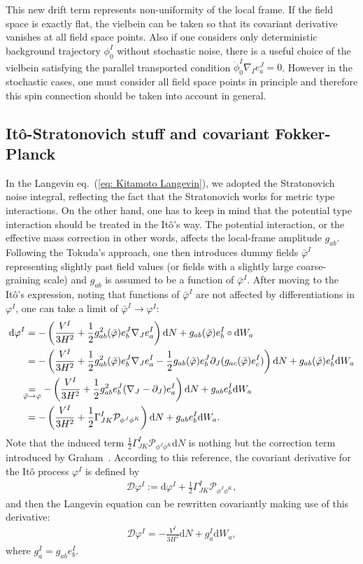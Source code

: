 \documentclass[aps, prd
, preprint
, nofootinbib 
, notitlepage
, longbibliography
]{revtex4-1}
\newcommand{\dd}{\mathrm{d}}
\newcommand{\calD}{\mathcal{D}}
\newcommand{\calP}{\mathcal{P}}
\newcommand{\bae}[1]{\begin{align} #1 \end{align}}
\begin{document}
This new drift term represents non-uniformity of the local frame. If the field space is exactly flat,
the vielbein can be taken so that its covariant derivative vanishes at all field space points.
Also if one considers only deterministic background trajectory $\phi^I_0$ without stochastic noise,
there is a useful choice of the vielbein satisfying the parallel transported condition $\dot{\phi}_0^I\nabla_Ie^J_a=0$. 
However in the stochastic cases, one must consider all field space points in principle and therefore this spin connection should be taken into account in general.


\subsection{It\^o-Stratonovich stuff and covariant Fokker-Planck}

In the Langevin eq.~(\ref{eq: Kitamoto Langevin}), we adopted the Stratonovich noise integral, reflecting the fact that the Stratonovich works for metric type interactions.
On the other hand, one has to keep in mind that the potential type interaction should be treated in the It\^o's way.
The potential interaction, or the effective mass correction in other words, affects the local-frame amplitude $g_{ab}$.
Following the Tokuda's approach, one then introduces dummy fields $\bar{\varphi}^I$ representing slightly past field values (or fields with a slightly large coarse-graining scale) and $g_{ab}$ is assumed to be a function of $\bar{\varphi}^I$.
After moving to the It\^o's expression, noting that functions of $\bar{\varphi}^I$ are not affected by differentiations in $\varphi^I$, one can take a limit of $\bar{\varphi}^I\to\varphi^I$:
\bae{\label{eq: Ito in field space}
    \dd\varphi^I&=-\left(\frac{V^I}{3H^2}+\frac{1}{2}g^2_{ab}(\bar{\varphi})e^J_b\nabla_Je^I_a\right)\dd N
    +g_{ab}(\bar{\varphi})e^I_b\circ\dd W_a \nonumber \\
    &=-\left(\frac{V^I}{3H^2}+\frac{1}{2}g^2_{ab}(\bar{\varphi})e^J_b\nabla_Je^I_a-\frac{1}{2}g_{ab}(\bar{\varphi})e^J_b\partial_J(g_{ac}(\bar{\varphi})e^I_c)\right)\dd N+g_{ab}(\bar{\varphi})e^I_b\dd W_a \nonumber \\
    &\hspace{-5pt}\underset{\bar{\varphi}\to\varphi}{=}-\left(\frac{V^I}{3H^2}+\frac{1}{2}g^2_{ab}e^J_b(\nabla_J-\partial_J)e^I_a\right)\dd N+g_{ab}e^I_b\dd W_a \nonumber \\
    &=-\left(\frac{V^I}{3H^2}+\frac{1}{2}\Gamma^I_{JK}\calP_{\phi^J\phi^K}\right)\dd N+g_{ab}e^I_b\dd W_a.
}
Note that the induced term $\frac{1}{2}\Gamma^I_{JK}\calP_{\phi^J\phi^K}\dd N$ is nothing but the correction term introduced by Graham~\cite{graham1985covariant}.
According to this reference, the covariant derivative for the It\^o process $\varphi^I$ is defined by
\bae{
	\calD\varphi^I:=\dd\varphi^I+\frac{1}{2}\Gamma^I_{JK}\calP_{\phi^J\phi^K},
}
and then the Langevin equation can be rewritten covariantly making use of this derivative:
\bae{
	\calD\varphi^I=-\frac{V^I}{3H^2}\dd N+g^I_a\dd W_a,
}
where $g^I_a=g_{ab}e^I_b$.
\end{document}
